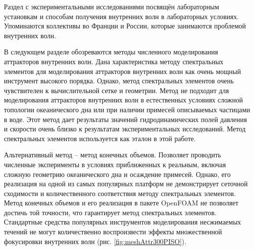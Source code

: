 \documentclass[utf8x]{G7-32} %
\begin{document}
Раздел с экспериментальными исследованиями посвящён лабораторным установкам и способам получения внутренних волн в лабораторных условиях. Упоминаются коллективы во Франции и России, которые занимаются проблемой внутренних волн.

В следующем разделе обозреваются методы численного моделирования аттракторов внутренних волн. Дана характеристика методу спектральных элементов для моделирования аттракторов внутренних волн как очень мощный инструмент высокого порядка. Однако, метод спектральных элементов очень чувствителен к вычислительной сетке и геометрии. Метод не подходит для моделирования аттракторов внутренних волн в естественных условиях сложной топологии океанического дна или при наличии примесей описываемых частицами в воде. Этот метод дает результаты значений гидродинамических полей давления и скорости очень близко к результатам экспериментальных исследований. Метод спектральных элементов используется как эталон в этой работе.

Альтернативный метод -- метод конечных объемов. Позволяет проводить численные эксперименты в условиях приближенных к реальным, включая сложную геометрию океанического дна и осаждение примесей. Однако, его реализация на одной из самых популярных платформ не демонстрирует сеточной сходимости и количественного соответствия методу спектральных элементов. Метод конечных объемов и его реализация в пакете OpenFOAM не позволяет достичь той точности, что гарантирует метод спектральных элементов. Стандартные средства популярных инструментов моделирования несжимаемых течений не могут количественно воспроизвести эффекты множественной фокусировки внутренних волн (рис. \ref{fig:meshAttr300PISO}).
\end{document}
